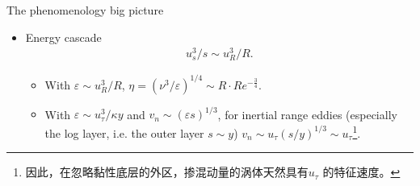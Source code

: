 \documentclass[10pt,xcolor={table,dvipsnames},t]{beamer}
\begin{document}
\begin{frame}{The phenomenology big picture}
    \begin{itemize}
        \item Energy cascade
            \begin{align*}
                u_s^3 / s \sim u_R^3 / R
            .\end{align*}
            \begin{itemize}
                \item With $\varepsilon \sim u_R^3 / R$, $\eta = \left( \nu^3 / \varepsilon \right)^{1 / 4}\sim R\cdot Re^{-\frac{3}{4}} $.
                \item With $\varepsilon  \sim {u_{\tau }^3}/{\kappa y}$ and $v_n\sim \left( \varepsilon s \right) ^{1 / 3} $, for inertial range eddies (especially the log layer, i.e. the outer layer $s \sim y$) $v_n \sim u_{\tau } \left( s / y \right) ^{1 / 3} \sim u_{\tau}$\footnote{因此，在忽略黏性底层的外区，掺混动量的涡体天然具有$u_{\tau }$ 的特征速度。}.
            \end{itemize}
    \end{itemize}
\end{frame}
\end{document}

